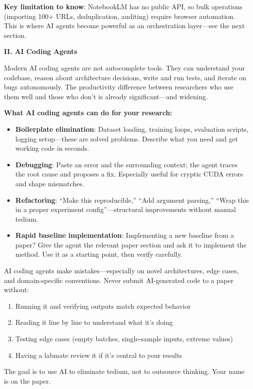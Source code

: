 \documentclass[11pt,a4paper]{article}
\begin{document}
\textbf{Key limitation to know}: NotebookLM has no public API, so bulk operations (importing 100+ URLs, deduplication, auditing) require browser automation. This is where AI agents become powerful as an orchestration layer---see the next section.

\textbf{II. AI Coding Agents}

Modern AI coding agents are not autocomplete tools. They can understand your codebase, reason about architecture decisions, write and run tests, and iterate on bugs autonomously. The productivity difference between researchers who use them well and those who don't is already significant---and widening.

\textbf{What AI coding agents can do for your research:}
\begin{itemize}
    \item \textbf{Boilerplate elimination}: Dataset loading, training loops, evaluation scripts, logging setup---these are solved problems. Describe what you need and get working code in seconds.
    \item \textbf{Debugging}: Paste an error and the surrounding context; the agent traces the root cause and proposes a fix. Especially useful for cryptic CUDA errors and shape mismatches.
    \item \textbf{Refactoring}: ``Make this reproducible,'' ``Add argument parsing,'' ``Wrap this in a proper experiment config''---structural improvements without manual tedium.
    \item \textbf{Rapid baseline implementation}: Implementing a new baseline from a paper? Give the agent the relevant paper section and ask it to implement the method. Use it as a starting point, then verify carefully.
\end{itemize}

\begin{tcolorbox}[colback=yellow!5,colframe=orange!60,title={Critical: Verify AI-Generated Code}]
AI coding agents make mistakes---especially on novel architectures, edge cases, and domain-specific conventions. Never submit AI-generated code to a paper without:
\begin{enumerate}
    \item Running it and verifying outputs match expected behavior
    \item Reading it line by line to understand what it's doing
    \item Testing edge cases (empty batches, single-sample inputs, extreme values)
    \item Having a labmate review it if it's central to your results
\end{enumerate}
The goal is to use AI to eliminate tedium, not to outsource thinking. Your name is on the paper.
\end{tcolorbox}
\end{document}
